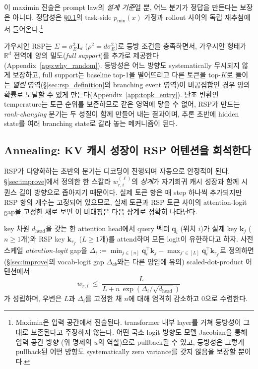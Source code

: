 이 maximin 진술은 prompt law의 \emph{설계 기준}일 뿐, 어느 분기가 정답을 만든다는 보장은 아니다. 정답성은 \S\ref{sec:converge}의 task-side $p_{\min}(x)$ 가정과 rollout 사이의 독립 재추첨에서 들어온다.\footnote{Maximin은 입력 공간에서 진술된다. transformer 내부 layer를 거쳐 등방성이 그대로 보존된다고 주장하지 않는다. 어떤 국소 logit 방향도 모델 Jacobian을 통해 입력 공간 방향 (위 명제의 $u$의 역할)으로 pullback될 수 있고, 등방성은 그렇게 pullback된 어떤 방향도 systematically zero variance를 갖지 않음을 보장할 뿐이다.}

가우시안 RSP는 $\Sigma = \sigma_E^2\mathbf{I}_d$ ($\rho^2 = d\sigma_E^2$)로 등방 조건을 충족하면서, 가우시안 형태가 $\mathbb{R}^d$ 전역에 양의 밀도(\emph{full support})를 추가로 제공한다(Appendix~\ref{app:why_random}). 등방성은 어느 방향도 systematically 무시되지 않게 보장하고, full support는 baseline top-1을 떨어뜨리고 다른 토큰을 top-$K$로 들이는 \emph{열린} 영역(\S\ref{sec:rsp_definition}의 branching event 영역)이 비공집합인 경우 양의 확률로 도달할 수 있게 만든다(Appendix~\ref{app:topk_entry}). 단조 변환인 temperature는 토큰 순위를 보존하므로 같은 영역에 닿을 수 없어, RSP가 만드는 \emph{rank-changing} 분기는 두 성질이 함께 만들어 내는 결과이며, 추론 초반에 hidden state를 여러 branching state로 갈라 놓는 메커니즘이 된다.


\subsection{Annealing: KV 캐시 성장이 RSP 어텐션을 희석한다}\label{sec:converge}

RSP가 다양화하는 초반의 분기는 디코딩이 진행되며 자동으로 안정적이 된다. \S\ref{sec:improve}에서 정의한 한 스칼라 $w_{r,i}^{(\ell)}$의 \emph{상계}가 자기회귀 캐시 성장과 함께 시퀀스 길이 방향으로 좁아지기 때문이다. 실제 토큰 항은 매 step 하나씩 추가되지만 RSP 항의 개수는 고정되어 있으므로, 실제 토큰과 RSP 토큰 사이의 attention-logit gap을 고정한 채로 보면 이 비대칭은 다음 상계로 정확히 나타난다.

\begin{theorem}\label{thm:decay}
key 차원 $d_{\text{head}}$을 갖는 한 attention head에서 query 벡터 $\mathbf{q}_i$ (위치 $i$)가 실제 key $\mathbf{k}_j$ ($n\ge1$개)와 RSP key $\mathbf{k}_{r_{j'}}$ ($L\ge1$개)를 attend하며 모든 logit이 유한하다고 하자. 사전 스케일 \emph{attention-logit} gap을 $\Delta_i := \min_{j\in[n]}\mathbf{q}_i^\top\mathbf{k}_j - \max_{j'\in[L]}\mathbf{q}_i^\top\mathbf{k}_{r_{j'}}$로 정의하면(\S\ref{sec:improve}의 vocab-logit gap $\Delta_{ab}$와는 다른 양임에 유의) scaled-dot-product 어텐션에서
\[
w_{r,i} \;\le\; \frac{L}{L + n\,\exp(\Delta_i/\sqrt{d_{\text{head}}})}
\]
가 성립하며, 우변은 $L$과 $\Delta_i$를 고정한 채 $n$에 대해 엄격히 감소하고 0으로 수렴한다.
\end{theorem}


